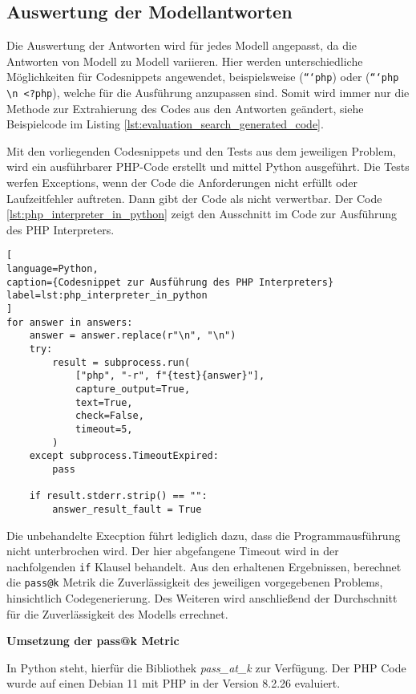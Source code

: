 \subsection{Auswertung der Modellantworten}
Die Auswertung der Antworten wird für jedes Modell angepasst, da die Antworten von Modell zu Modell variieren. Hier werden unterschiedliche Möglichkeiten für Codesnippets angewendet, beispielsweise (\texttt{```php}) oder (\texttt{```php \textbackslash n <?php}), welche für die Ausführung anzupassen sind. Somit wird immer nur die Methode zur Extrahierung des Codes aus den Antworten geändert, siehe Beispielcode im Listing \ref{lst:evaluation_search_generated_code}.\vspace{0.2cm}

Mit den vorliegenden Codesnippets und den Tests aus dem jeweiligen Problem, wird ein ausführbarer PHP-Code erstellt und mittel Python ausgeführt. Die Tests werfen Exceptions, wenn der Code die Anforderungen nicht erfüllt oder Laufzeitfehler auftreten. Dann gibt der Code als nicht verwertbar. Der Code \ref{lst:php_interpreter_in_python} zeigt den Ausschnitt im Code zur Ausführung des PHP Interpreters.

\begin{lstlisting}[
language=Python,
caption={Codesnippet zur Ausführung des PHP Interpreters}
label=lst:php_interpreter_in_python
]
for answer in answers:
    answer = answer.replace(r"\n", "\n")
    try:
        result = subprocess.run(
            ["php", "-r", f"{test}{answer}"],
            capture_output=True,
            text=True,
            check=False,
            timeout=5,
        )
    except subprocess.TimeoutExpired:
        pass

    if result.stderr.strip() == "":
        answer_result_fault = True
\end{lstlisting}

Die unbehandelte Execption führt lediglich dazu, dass die Programmausführung nicht unterbrochen wird. Der hier abgefangene Timeout wird in der nachfolgenden \texttt{if} Klausel behandelt. Aus den erhaltenen Ergebnissen, berechnet die \texttt{pass@k} Metrik die Zuverlässigkeit des jeweiligen vorgegebenen Problems, hinsichtlich Codegenerierung. Des Weiteren wird anschließend der Durchschnitt für die Zuverlässigkeit des Modells errechnet.\vspace{0.2cm}

\textbf{Umsetzung der pass@k Metric}\vspace{0.2cm}

In Python steht, hierfür die Bibliothek \textit{pass\_at\_k} zur Verfügung. Der PHP Code wurde auf einen Debian 11 mit PHP in der Version 8.2.26 evaluiert.

